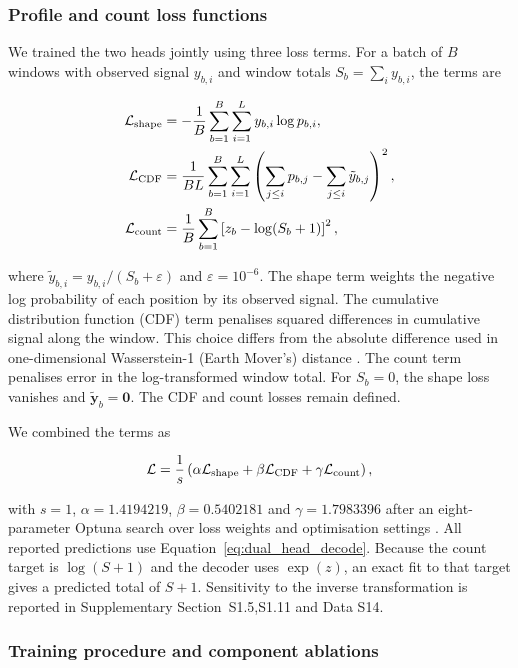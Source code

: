 \documentclass[webpdf,contemporary,large]{current_assets/oup-authoring-template}
\newcommand{\supsect}[1]{Supplementary Section~#1}
\begin{document}
\subsubsection{Profile and count loss functions}\label{subsec:loss}

We trained the two heads jointly using three loss terms. For a batch of $B$ windows with observed signal $y_{b,i}$ and window totals $S_b=\sum_i y_{b,i}$, the terms are

\begin{align}
\mathcal L_{\rm shape}
&=-\frac1B\sum_{b=1}^{B}\sum_{i=1}^{L}y_{b,i}\log p_{b,i},
\label{eq:shape_loss}\\
\mathcal L_{\rm CDF}
&=\frac1{BL}\sum_{b=1}^{B}\sum_{i=1}^{L}
\left(\sum_{j\leq i}p_{b,j}-\sum_{j\leq i}\tilde y_{b,j}\right)^2,
\label{eq:cdf_loss}\\
\mathcal L_{\rm count}
&=\frac1B\sum_{b=1}^{B}\left[z_b-\log(S_b+1)\right]^2,
\label{eq:main_count_loss}
\end{align}

where $\tilde y_{b,i}=y_{b,i}/(S_b+\varepsilon)$ and $\varepsilon=10^{-6}$. The shape term weights the negative log probability of each position by its observed signal. The cumulative distribution function (CDF) term penalises squared differences in cumulative signal along the window. This choice differs from the absolute difference used in one-dimensional Wasserstein-1 (Earth Mover's) distance \citep{rubner2000emd}. The count term penalises error in the log-transformed window total. For $S_b=0$, the shape loss vanishes and $\tilde{\mathbf y}_b=\mathbf0$. The CDF and count losses remain defined.

We combined the terms as

\begin{equation}
\mathcal L=\frac1s
\left(\alpha\mathcal L_{\rm shape}+
\beta\mathcal L_{\rm CDF}+\gamma\mathcal L_{\rm count}\right),
\label{eq:total_loss}
\end{equation}

with $s=1$, $\alpha=1.4194219$, $\beta=0.5402181$ and $\gamma=1.7983396$ after an eight-parameter Optuna search over loss weights and optimisation settings \citep{akiba2019optuna}. All reported predictions use Equation~\ref{eq:dual_head_decode}. Because the count target is $\log(S+1)$ and the decoder uses $\exp(z)$, an exact fit to that target gives a predicted total of $S+1$. Sensitivity to the inverse transformation is reported in \supsect{S1.5,S1.11} and Data S14.

\subsubsection{Training procedure and component ablations}\label{subsec:ml}
\end{document}
